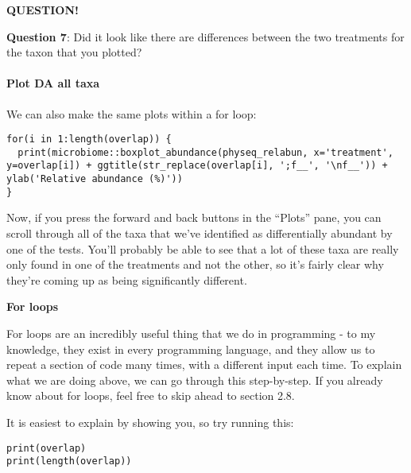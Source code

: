 \documentclass[
]{book}
\newenvironment{bluebox}{
  \definecolor{shadecolor}{RGB}{172, 210, 237}
  \color{white}
  \begin{shaded}}
 {\end{shaded}}
\newenvironment{greenbox}{
  \definecolor{shadecolor}{RGB}{141, 181, 128}
  \color{white}
  \begin{shaded}}
 {\end{shaded}}
\begin{document}
\begin{bluebox}

\begin{center}
\textbf{QUESTION!}

\end{center}

\textbf{Question 7}: Did it look like there are differences between the two treatments for the taxon that you plotted?

\end{bluebox}

\paragraph{Plot DA all taxa}\label{plot-da-all-taxa}

We can also make the same plots within a for loop:

\begin{verbatim}
for(i in 1:length(overlap)) {
  print(microbiome::boxplot_abundance(physeq_relabun, x='treatment', y=overlap[i]) + ggtitle(str_replace(overlap[i], ';f__', '\nf__')) + ylab('Relative abundance (%)'))
}
\end{verbatim}

Now, if you press the forward and back buttons in the ``Plots'' pane, you can scroll through all of the taxa that we've identified as differentially abundant by one of the tests. You'll probably be able to see that a lot of these taxa are really only found in one of the treatments and not the other, so it's fairly clear why they're coming up as being significantly different.

\begin{greenbox}

\begin{center}
\textbf{For loops}

\end{center}

For loops are an incredibly useful thing that we do in programming - to my knowledge, they exist in every programming language, and they allow us to repeat a section of code many times, with a different input each time. To explain what we are doing above, we can go through this step-by-step. If you already know about for loops, feel free to skip ahead to section 2.8.

\end{greenbox}

It is easiest to explain by showing you, so try running this:

\begin{verbatim}
print(overlap)
print(length(overlap))
\end{verbatim}
\end{document}
